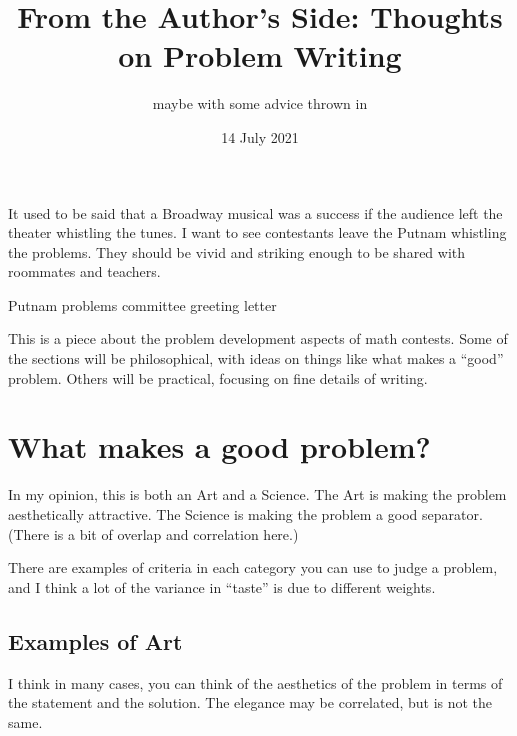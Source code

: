 \documentclass[11pt]{scrartcl}
\theoremstyle{inlined}
\begin{document}
\title{From the Author's Side: Thoughts on Problem Writing}
\subtitle{maybe with some advice thrown in}
\date{14 July 2021}
\maketitle

\epigraph{It used to be said that a Broadway musical was
  a success if the audience left the theater whistling the tunes.
  I want to see contestants leave the Putnam whistling the problems.
  They should be vivid and striking enough to be shared with roommates and teachers.}
  {Putnam problems committee greeting letter}

This is a piece about the problem development aspects of math contests.
Some of the sections will be philosophical,
with ideas on things like what makes a ``good'' problem.
Others will be practical, focusing on fine details of writing.

\tableofcontents
\pagebreak

\section{What makes a good problem?}
In my opinion, this is both an Art and a Science.
The Art is making the problem aesthetically attractive.
The Science is making the problem a good separator.
(There is a bit of overlap and correlation here.)

There are examples of criteria in each category
you can use to judge a problem,
and I think a lot of the variance in ``taste'' is due to different weights.

\subsection{Examples of Art}
I think in many cases, you can think of the aesthetics
of the problem in terms of the statement and the solution.
The elegance may be correlated, but is not the same.
\end{document}
